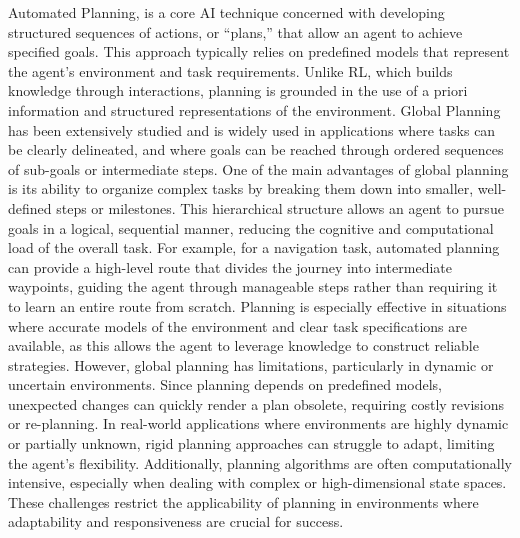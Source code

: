 Automated Planning, is a core AI technique concerned with developing structured sequences of actions, or “plans,” 
that allow an agent to achieve specified goals. 
This approach typically relies on predefined models that represent the agent’s environment and task requirements.
Unlike RL, which builds knowledge through interactions, planning is grounded in the use of a priori information and
structured representations of the environment.
Global Planning has been extensively studied and is widely used in applications where tasks can be clearly delineated,
and where goals can be reached through ordered sequences of sub-goals or intermediate steps.  %
One of the main advantages of global planning is its ability to organize complex tasks by breaking them down into
smaller, well-defined steps or milestones.
This hierarchical structure allows an agent to pursue goals in a logical, sequential manner, reducing the cognitive
and computational load of the overall task.
For example, for a navigation task, automated planning can provide a high-level route that divides the journey into intermediate
waypoints, guiding the agent through manageable steps rather than requiring it to learn an entire route from scratch.
Planning is especially effective in situations where accurate models of the environment and clear task specifications
are available, as this allows the agent to leverage knowledge to construct reliable strategies.
However, global planning has limitations, particularly in dynamic or uncertain environments.
Since planning depends on predefined models, unexpected changes can quickly render a plan obsolete, requiring costly
revisions or re-planning.
In real-world applications where environments are highly dynamic or partially unknown, rigid planning approaches can
struggle to adapt, limiting the agent’s flexibility.
Additionally, planning algorithms are often computationally intensive, especially when dealing with complex or
high-dimensional state spaces.
These challenges restrict the applicability of planning in environments where adaptability and responsiveness are
crucial for success.

